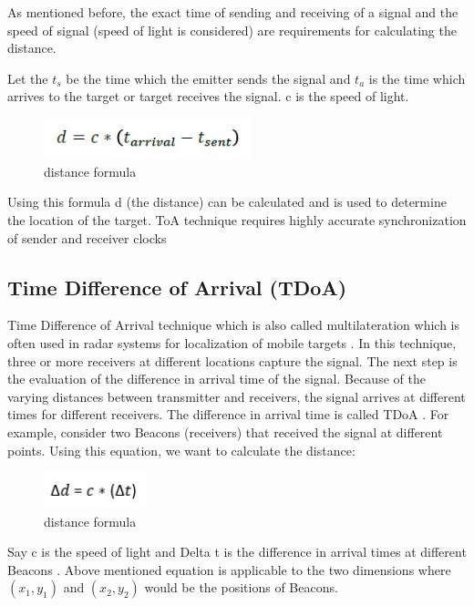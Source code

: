 As mentioned before, the exact time of sending and receiving of a signal and the speed of signal (speed of light is considered) are requirements for calculating the distance.\cite{brian17}

Let the $t_s$ be the time which the emitter sends the signal and $t_a$ is the time which arrives to the target or target receives the signal. c is the speed of light.

\begin{figure}[htp]
    \centering
    \includegraphics[width=6cm]{3.jpg}
    \caption{distance formula \cite{jin18}}
    \label{fig:Localization}
\end{figure}
Using this formula d (the distance) can be calculated and is used to determine the location of the target. ToA technique requires highly accurate synchronization of sender and receiver clocks \cite{jin18}




\subsection{Time Difference of Arrival (TDoA)}
Time Difference of Arrival technique which is also called multilateration which is often used in radar systems for localization of mobile targets \cite{schaefer15}. In this technique, three or more receivers at different locations capture the signal. The next step is the evaluation of the difference in arrival time of the signal. Because of the varying distances between transmitter and receivers, the signal arrives at different times for different receivers. The difference in arrival time is called TDoA \cite{brian17}.
For example, consider two Beacons (receivers) that received the signal at different points. Using this equation, we want to calculate the distance:

\begin{figure}[htp]
    \centering
    \includegraphics[width=3cm]{4.jpg}
    \caption{distance formula \cite{jin18}}
    \label{fig:formula}
\end{figure}

Say c is the speed of light and Delta t is the difference in arrival times at different Beacons \cite{schaefer18}. Above mentioned equation is applicable to the two dimensions where $(x_1,y_1)$ and $(x_2,y_2)$ would be the positions of Beacons.



